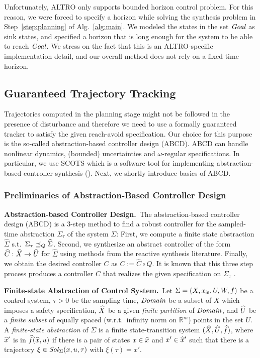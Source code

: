 \begin{remark}
	Unfortunately, ALTRO only supports bounded horizon control problem.
	For this reason, we were forced to specify a horizon while solving the synthesis problem in Step~\ref{step:planning} of Alg.~\ref{alg:main}.
	We modeled the states in the set $\mathit{Goal}$ as sink states, and specified a horizon that is long enough for the system to be able to reach $\mathit{Goal}$.
	We stress on the fact that this is an ALTRO-specific implementation detail, and our overall method does not rely on a fixed time horizon.
\end{remark}



\subsection{Guaranteed Trajectory Tracking} 

Trajectories computed in the planning stage might not be followed in the presence of disturbance and therefore we need to use a formally guaranteed tracker to satisfy the given reach-avoid specification. Our choice for this purpose is the so-called abstraction-based controller design (ABCD). ABCD can handle nonlinear dynamics, (bounded) uncertainties and $\omega$-regular specifications. In particular, we use SCOTS which is a software tool for implementing abstraction-based controller synthesis (\cite{Rungger2016scots}). Next, we shortly introduce basics of ABCD.
\subsubsection{Preliminaries of Abstraction-Based Controller Design}\hfill
\smallskip
\noindent\textbf{Abstraction-based Controller Design.}\
The abstraction-based controller design (ABCD) \cite{reissig2016feedback} is a $3$-step method to find a robust controller for the sampled-time abstraction $\Sigma_\tau$ of the system $\Sigma$:
First, we compute a finite state abstraction $\widehat{\Sigma}$ s.t.\ $\Sigma_\tau \preceq_{Q} \widehat{\Sigma}$.
Second, we synthesize an abstract controller of the form $\widehat{C}:\widehat{X}\rightarrow \widehat{U}$ for $\widehat{\Sigma}$ using methods from the reactive synthesis literature.
Finally, we obtain the desired controller $C$ as $C:=\widehat{C}\circ Q$.
It is known that this three step process produces a controller $C$ that realizes the given specification on $\Sigma_\tau$ \cite{reissig2016feedback}.


\smallskip
\noindent\textbf{Finite-state Abstraction of Control System.}\
Let $\Sigma = (X,x_{\mathsf{in}}, U, W, f)$ be a control system, $\tau>0$ be the sampling time, $\mathit{Domain}$ be a subset of $X$ which imposes a safety specification, $\widehat{X}$ be a given \emph{finite partition} of $\mathit{Domain}$, and $\widehat{U}$ be a \emph{finite subset} of equally spaced (w.r.t.\ infinity norm on $\mathbb{R}^m$) points in the set $U$.
A \emph{finite-state abstraction} of $\Sigma$ is a finite state-transition system $(\widehat{X},\widehat{U},\widehat{f})$, where $\widehat{x}'$ is in $\widehat{f}(\widehat{x},u)$ if there is a pair of states $x\in \widehat{x}$ and $x'\in \widehat{x}'$ such that there is a trajectory $\xi\in \mathit{Sol}_\Sigma(x,u,\tau)$ with $\xi(\tau)=x'$.

